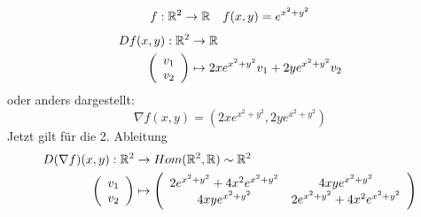 \documentclass[main.tex]{subfiles}
\begin{document}
\begin{Beispiel}
  $$f: \mathbb{R}^2 \to \mathbb{R} \quad f(x,y) = e^{x^2 + y^2}$$
  $$\begin{aligned}
    Df(x,y): \mathbb{R}^2 & \to \mathbb{R} \\
    \left(\begin{array}{c}v_1 \\ v_2 \end{array}\right) & \mapsto 2xe^{x^2 + y^2}v_1 + 2ye^{x^2 + y^2}v_2
  \end{aligned}$$
  oder anders dargestellt:
  $$\nabla f(x,y) = \left(2xe^{x^2 + y^2}, 2ye^{x^2 + y^2}\right)$$
  Jetzt gilt für die 2. Ableitung
  $$\begin{aligned}
    D(\nabla f)(x,y): \mathbb{R}^2 & \to Hom(\mathbb{R}^2,\mathbb{R}) \sim \mathbb{R}^2 \\
    \left( \begin{array}{c} v_1 \\ v_2 \end{array} \right) & \mapsto \left(\begin{array}{c c }2e^{x^2 + y^2} + 4x^2 e^{x^2 + y^2} & 4xy e^{x^2 + y^2}\\ 4xy e^{x^2 + y^2} & 2e^{x^2 + y^2} + 4x^2 e^{x^2 + y^2} \end{array}\right)
  \end{aligned}$$
\end{Beispiel}
\end{document}
